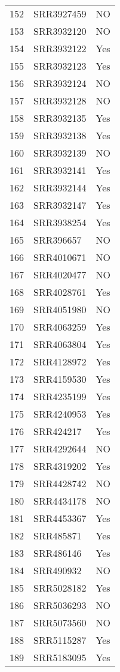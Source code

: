 \begin{table}[ht]
\begin{tabular}{rll}
  152 & SRR3927459 & NO \\ 
  153 & SRR3932120 & NO \\ 
  154 & SRR3932122 & Yes \\ 
  155 & SRR3932123 & Yes \\ 
  156 & SRR3932124 & NO \\ 
  157 & SRR3932128 & NO \\ 
  158 & SRR3932135 & Yes \\ 
  159 & SRR3932138 & Yes \\ 
  160 & SRR3932139 & NO \\ 
  161 & SRR3932141 & Yes \\ 
  162 & SRR3932144 & Yes \\ 
  163 & SRR3932147 & Yes \\ 
  164 & SRR3938254 & Yes \\ 
  165 & SRR396657 & NO \\ 
  166 & SRR4010671 & NO \\ 
  167 & SRR4020477 & NO \\ 
  168 & SRR4028761 & Yes \\ 
  169 & SRR4051980 & NO \\ 
  170 & SRR4063259 & Yes \\ 
  171 & SRR4063804 & Yes \\ 
  172 & SRR4128972 & Yes \\ 
  173 & SRR4159530 & Yes \\ 
  174 & SRR4235199 & Yes \\ 
  175 & SRR4240953 & Yes \\ 
  176 & SRR424217 & Yes \\ 
  177 & SRR4292644 & NO \\ 
  178 & SRR4319202 & Yes \\ 
  179 & SRR4428742 & NO \\ 
  180 & SRR4434178 & NO \\ 
  181 & SRR4453367 & Yes \\ 
  182 & SRR485871 & Yes \\ 
  183 & SRR486146 & Yes \\ 
  184 & SRR490932 & NO \\ 
  185 & SRR5028182 & Yes \\ 
  186 & SRR5036293 & NO \\ 
  187 & SRR5073560 & NO \\ 
  188 & SRR5115287 & Yes \\ 
  189 & SRR5183095 & Yes \\ 

\end{tabular}
\end{table}
